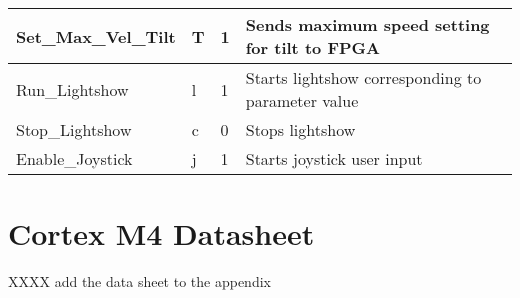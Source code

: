 \begin{table}[]
\begin{tabular}{ | l | l | l | p{5cm} |}
     Set\_Max\_Vel\_Tilt & T & 1 & Sends maximum speed setting for tilt to FPGA \\
    \hline
    
     Run\_Lightshow & l & 1 & Starts lightshow corresponding to parameter value \\
    \hline
    
     Stop\_Lightshow & c & 0 & Stops lightshow \\
    \hline
    
    Enable\_Joystick & j & 1 & Starts joystick user input \\
    \hline
    \end{tabular}
    
\end{table}


\section{Cortex M4 Datasheet}
\label{sec:CortexM4Datasheet}
XXXX add the data sheet to the appendix